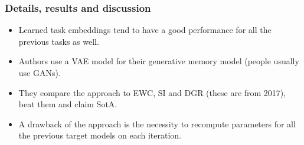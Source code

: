 \documentclass[10pt]{beamer}
\begin{document}
\begin{frame}
    \frametitle{Details, results and discussion}
    \begin{itemize}
        \item Learned task embeddings tend to have a good performance for all the previous tasks as well.
        \item Authors use a VAE model for their generative memory model (people usually use GANs).
        \item They compare the approach to EWC, SI and DGR (these are from 2017), beat them and claim SotA.
        \item A drawback of the approach is the necessity to recompute parameters for all the previous target models on each iteration.
    \end{itemize}
\end{frame}
\end{document}
